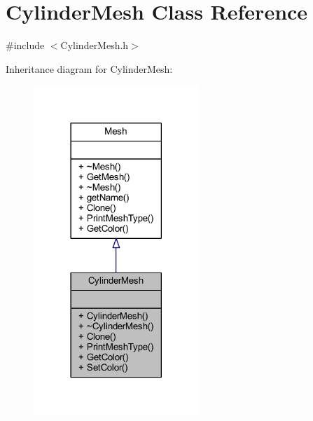 \hypertarget{class_cylinder_mesh}{}\section{Cylinder\+Mesh Class Reference}
\label{class_cylinder_mesh}


{\ttfamily \#include $<$Cylinder\+Mesh.\+h$>$}



Inheritance diagram for Cylinder\+Mesh\+:
\nopagebreak
\begin{figure}[H]
\begin{center}
\leavevmode
\includegraphics[width=177pt]{class_cylinder_mesh__inherit__graph}
\end{center}
\end{figure}


